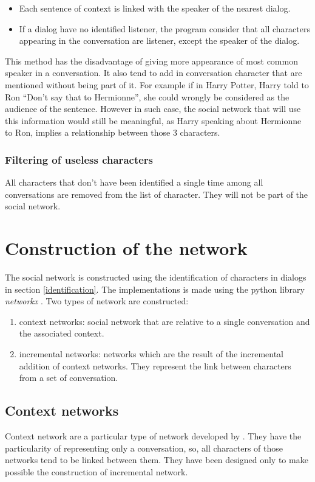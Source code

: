 \documentclass[a4paper, 12pt]{report}
\begin{document}
\begin{itemize}
\item Each sentence of context is linked with the speaker of the nearest dialog.

\item If a dialog have no identified listener, the program consider that all characters appearing in the conversation are listener, except the speaker of the dialog.
\end{itemize}
This method has the disadvantage of giving more appearance of most common speaker in a conversation. It also tend to add in conversation character that are mentioned without being part of it. For example if in Harry Potter, Harry told to Ron ``Don't say that to Hermionne'', she could wrongly be considered as the audience of the sentence. However in such case, the social network that will use this information would still be meaningful, as Harry speaking about Hermionne to Ron, implies a relationship between those 3 characters.


\subsubsection{Filtering of useless characters}
All characters that don't have been identified a single time among all conversations are removed from the list of character. They will not be part of the social network.




\section{Construction of the network}
The social network is constructed using the identification of characters in dialogs in section \ref{identification}. The implementations is made using the python library \textit{networkx} \citep{networkx}.
Two types of network are constructed:
\begin{enumerate}
\item context networks: social network that are relative to a single conversation and the associated context. 
\item incremental networks: networks which are the result of the incremental addition of context networks. They represent the link between characters from a set of conversation.
\end{enumerate}
\subsection{Context networks}
Context network are a particular type of network developed by \cite{original}. They have the particularity of representing only a conversation, so, all characters of those networks tend to be linked between them. They have been designed only to make possible the construction of incremental network. \\
\end{document}
